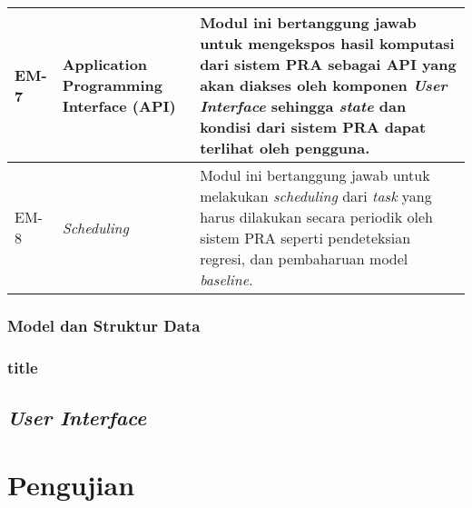 \begin{small}
\begin{longtable}{ | p{1cm} | p{3cm} | p{10cm} | }
		EM-7 & Application Programming Interface (API) & Modul ini bertanggung jawab untuk mengekspos hasil komputasi dari sistem PRA sebagai API yang akan diakses oleh komponen \textit{User Interface} sehingga \textit{state} dan kondisi dari sistem PRA dapat terlihat oleh pengguna. \\ \hline
		EM-8 & \textit{Scheduling} & Modul ini bertanggung jawab untuk melakukan \textit{scheduling} dari \textit{task} yang harus dilakukan secara periodik oleh sistem PRA seperti pendeteksian regresi, dan pembaharuan model \textit{baseline}. \\ \hline
	\end{longtable}
\end{small}

\subsubsection{Model dan Struktur Data}

\subsubsection{title}

\subsection{\textit{User Interface}}


\section{Pengujian}
